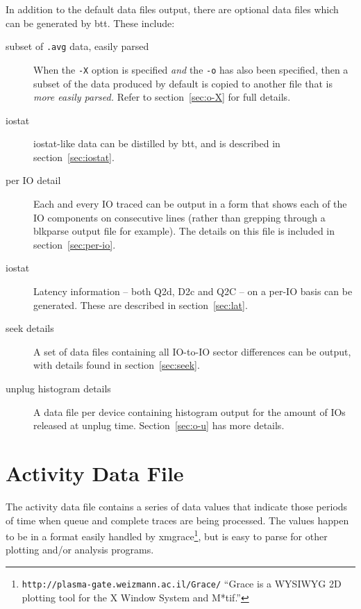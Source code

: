 \documentclass{article}
\begin{document}
  In addition to the default data files output, there are optional data
  files which can be generated by btt. These include:

  \begin{description}
    \item[subset of \texttt{.avg} data, easily parsed ] When the
    \texttt{-X} option is specified \emph{and} the \texttt{-o} has also
    been specified, then a subset of the data produced by default is
    copied to another file that is \emph{more easily parsed.} Refer to
    section~\ref{sec:o-X} for full details.

    \item[iostat] iostat-like data can be distilled by btt, and is
    described in section~\ref{sec:iostat}.

    \item[per IO detail] Each and every IO traced can be output in a form
    that shows each of the IO components on consecutive lines (rather
    than grepping through a blkparse output file for example). The
    details on this file is included in section~\ref{sec:per-io}.

    \item[iostat] Latency information -- both Q2d, D2c and Q2C --
    on a per-IO basis can be generated. These are described in
    section~\ref{sec:lat}.

    \item[seek details] A set of data files containing all IO-to-IO
    sector differences can be output, with details found in
    section~\ref{sec:seek}.

    \item[unplug histogram details] A data file per device containing
    histogram output for the amount of IOs released at unplug time.
    Section~\ref{sec:o-u} has more details.
  \end{description}

\newpage\section{\label{sec:activity}Activity Data File}

  The activity data file contains a series of data values that indicate
  those periods of time when queue and complete traces are being
  processed.  The values happen to be in a format easily handled by
  xmgrace\footnote{\texttt{http://plasma-gate.weizmann.ac.il/Grace/}
  ``Grace is a WYSIWYG 2D plotting tool for the X Window System and
  M*tif.''}, but is easy to parse for other plotting and/or analysis
  programs.
\end{document}
